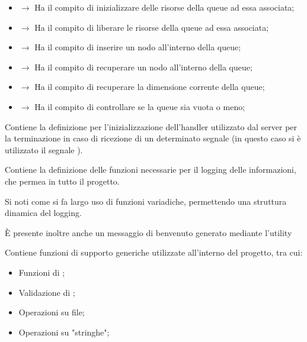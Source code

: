   \begin{itemize}
    \item {} $\rightarrow$ Ha il compito di inizializzare delle risorse della queue ad essa associata;
    \item {} $\rightarrow$ Ha il compito di liberare le risorse della queue ad essa associata;
    \item {} $\rightarrow$ Ha il compito di inserire un nodo all'interno della queue;
    \item {} $\rightarrow$ Ha il compito di recuperare un nodo all'interno della queue;
    \item {} $\rightarrow$ Ha il compito di recuperare la dimensione corrente della queue;
    \item {} $\rightarrow$ Ha il compito di controllare se la queue sia vuota o meno;
  \end{itemize}


  \begin{center}  \end{center}
  Contiene la definizione per l'inizializzazione dell'handler utilizzato dal server per la terminazione in caso di ricezione di un determinato segnale (in questo caso si è utilizzato il segnale ).

  \begin{center}  \end{center}
  Contiene la definizione delle funzioni necessarie per il logging delle informazioni, che permea in tutto il progetto.

  Si noti come si fa largo uso di funzioni variadiche, permettendo una struttura dinamica del logging.

  È presente inoltre anche un messaggio di benvenuto generato mediante l'utility 

  \begin{center}  \end{center}
  Contiene funzioni di supporto generiche utilizzate all'interno del progetto, tra cui:

  \begin{itemize}
    \item Funzioni di \href{https://it.wikipedia.org/wiki/Sequenziamento}{};
    \item Validazione di ;
    \item Operazioni su file;
    \item Operazioni su "stringhe";
  \end{itemize}
  \newpage
